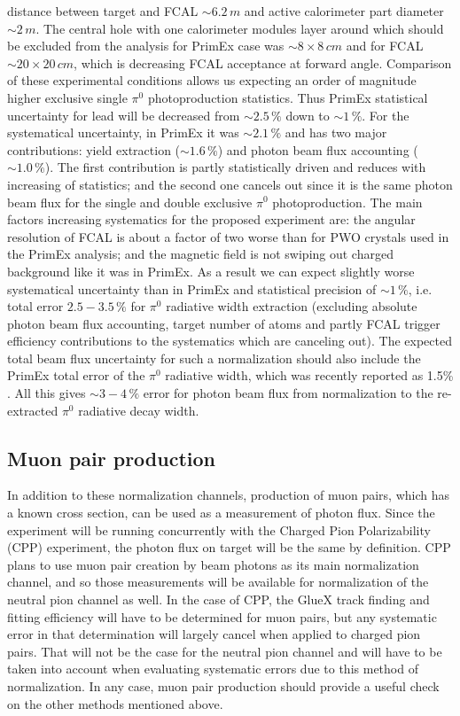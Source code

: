 distance between target and FCAL $\sim6.2\,m$ and active calorimeter
part diameter $\sim2\,m$.  The central hole with one calorimeter
modules layer around which should be excluded from the analysis for
PrimEx case was $\sim8\times8\,cm$ and for FCAL $\sim20\times20\,cm$,
which is decreasing FCAL acceptance at forward angle. Comparison of
these experimental conditions allows us expecting an order of
magnitude higher exclusive single $\pi^0$ photoproduction statistics.
Thus PrimEx statistical uncertainty for lead will be decreased from
$\sim2.5\,\%$ down to $\sim1\,\%$.  For the systematical uncertainty,
in PrimEx it was $\sim2.1\,\%$ and has two major contributions: yield
extraction ($\sim1.6\,\%$) and photon beam flux accounting
($\sim1.0\,\%$).  The first contribution is partly statistically
driven and reduces with increasing of statistics; and the second one
cancels out since it is the same photon beam flux for the single and
double exclusive $\pi^0$ photoproduction.  The main factors increasing
systematics for the proposed experiment are: the angular resolution of
FCAL is about a factor of two worse than for PWO crystals used in the
PrimEx analysis;
and the magnetic field is not swiping out charged background like it
was in PrimEx.  As a result we can expect slightly worse systematical
uncertainty than in PrimEx and statistical precision of $\sim1\,\%$,
i.e. total error $2.5-3.5\,\%$ for $\pi^0$ radiative width extraction
(excluding absolute photon beam flux accounting, target number of
atoms and partly FCAL trigger efficiency contributions to the
systematics which are canceling out).  The expected total beam flux
uncertainty for such a normalization should also include the PrimEx
total error of the $\pi^0$ radiative width, which was recently
reported as 1.5\% \cite{Larin:2018}.  All this gives $\sim3-4\,\%$
error for photon beam flux from normalization to the re-extracted $\pi^0$ radiative decay width.

\subsection{Muon pair production}
In addition to these normalization channels, production of muon pairs,
which has a known cross section, can be used as a measurement of
photon flux. Since the experiment will be running concurrently with
the Charged Pion Polarizability (CPP) experiment, the photon flux on
target will be the same by definition. CPP plans to use muon pair
creation by beam photons as its main normalization channel, and so
those measurements will be available for normalization of the neutral
pion channel as well. In the case of CPP, the GlueX track finding and
fitting efficiency will have to be determined for muon pairs, but any
systematic error in that determination will largely cancel when
applied to charged pion pairs. That will not be the case for the
neutral pion channel and will have to be taken into account when
evaluating systematic errors due to this method of normalization. In
any case, muon pair production should provide a useful check on the
other methods mentioned above.

